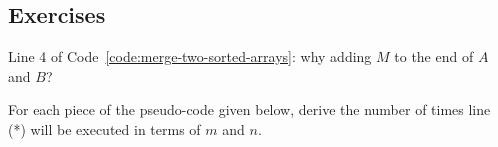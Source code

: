\subsection*{Exercises}
  \begin{exercises}
    \item \label{ex:first} 
	Line 4 of Code~\ref{code:merge-two-sorted-arrays}: why adding $M$ to the end of $A$ and $B$?

	\item For each piece of the pseudo-code given below, derive the number of times line (*) will be executed
	in terms of $m$ and $n$.

\begin{minipage}[t]{0.33\textwidth}
\begin{algorithmblock*}
	\xxx
	\xxx
	\xxx
	\xxx
\end{algorithmblock*}
\end{minipage}
\begin{minipage}[t]{0.33\textwidth}
\begin{algorithmblock*} 
	\xxx
	\xxx
	\xxx
	\xxx
\end{algorithmblock*}
\end{minipage}
\begin{minipage}[t]{0.33\textwidth}
\begin{algorithmblock*} 
	\xxx
	\xxx
	\xxx
	\xxx
\end{algorithmblock*}
\end{minipage}




\end{exercises}
